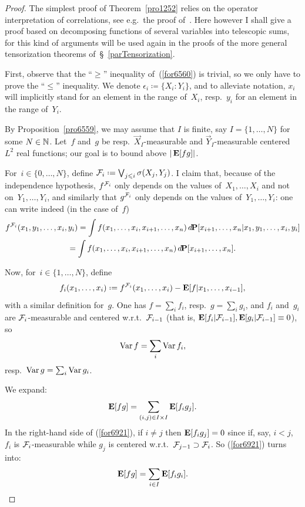 \begin{proof}
The simplest proof of Theorem~\ref{pro1252}
relies on the operator interpretation of correlations,
see e.g.\ the proof of~\cite[Theorem~1]{Witsenhausen}.
Here however I shall give a proof
based on decomposing functions of several variables into telescopic sums,
for this kind of arguments will be used again
in the proofs of the more general tensorization theorems of~\S~\ref{parTensorization}.

First, observe that the ``$\geq$'' inequality of~(\ref{for6560}) is trivial,
so we only have to prove the ``$\leq$'' inequality.
We denote $\epsilon_i \coloneqq {\{X_i:Y_i\}}$,
and to alleviate notation, $x_i$ will implicitly stand for an element in the range of~$X_i$,
resp.~$y_i$ for an element in the range of~$Y_i$.

By Proposition~\ref{pro6559}, we may assume that $I$ is finite,
say $I = \{1,\ldots,N\}$ for some $N\in\mathbb{N}$.
Let~$f$ and~$g$ be resp.\ $\vec{X}_I$-measurable and $\vec{Y}_I$-measurable
centered $L^2$ real functions; our goal is to bound above $|\mathop{\smash{\mathbf{E}}}\nolimits[fg]|$.

For~$i\in\{0,\ldots,N\}$, define $\mcal{F}_i \coloneqq \bigvee_{j\leq i} \sigma(X_j,Y_j)$.
I claim that, because of the independence hypothesis,
$f^{\mathcal{F}_i}$ only depends on the values of~$X_1,\ldots,X_i$
and not on~$Y_1,\ldots,Y_i$, and similarly
that $g^{\mathcal{F}_i}$ only depends on the values of~$Y_1,\ldots,Y_i$:
one can write indeed (in the case of~$f$)
\begin{multline} f^{\mcal{F}_i} (x_1,y_1,\ldots,x_i,y_i)
= \int f(x_1,\ldots,x_i,x_{i+1},\ldots,x_n) \,\dx\Pr[x_{i+1},\ldots,x_n|x_1,y_1,\ldots,x_i,y_i] \\
= \int f(x_1,\ldots,x_i,x_{i+1},\ldots,x_n) \,\dx\Pr[x_{i+1},\ldots,x_n] .
\end{multline}

Now, for~$i\in\{1,\ldots,N\}$, define
\[ f_i(x_1,\ldots,x_i) \coloneqq f^{\mcal{F}_i}(x_1,\ldots,x_i) - \EE[f|x_1,\ldots,x_{i-1}] ,\]
with a similar definition for~$g$.
One has $f = \sum_i f_i$, resp.\ $g = \sum_i g_i$,
and $f_i$ and~$g_i$ are $\mathcal{F}_i$-measurable and centered w.r.t.~$\mathcal{F}_{i-1}$
(that is, $\mathop{\smash{\mathbf{E}}}\nolimits[f_i|\mathcal{F}_{i-1}], \mathop{\smash{\mathbf{E}}}\nolimits[g_i|\mathcal{F}_{i-1}] \equiv 0$), so
\[ \operatorname{Var} f = \sum_i \operatorname{Var} f_i ,\]
resp.\ $\operatorname{Var} g = \sum_i \operatorname{Var} g_i$.

We expand:
\[\label{for6921} \mathop{\smash{\mathbf{E}}}\nolimits[fg] = \sum_{(i,j)\in I\times I} \mathop{\smash{\mathbf{E}}}\nolimits[f_ig_j] .\]
In the right-hand side of (\ref{for6921}), if $i\neq j$ then
$\mathop{\smash{\mathbf{E}}}\nolimits[f_ig_j] = 0$ since if, say, $i<j$,
$f_i$ is $\mathcal{F}_i$-measurable while $g_j$ is centered w.r.t.~$\mathcal{F}_{j-1} \supset \mathcal{F}_i$.
So (\ref{for6921}) turns into:
\[ \mathop{\smash{\mathbf{E}}}\nolimits[fg] = \sum_{i\in I} \mathop{\smash{\mathbf{E}}}\nolimits[f_ig_i] .\]


\end{proof}
